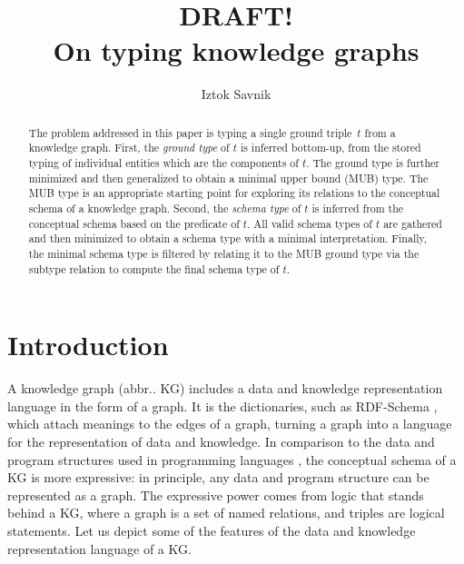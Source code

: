\documentclass[runningheads]{llncs}
\begin{document}
\title{DRAFT! \\ On typing knowledge graphs}

\author{Iztok Savnik} 



\maketitle

\begin{abstract}
  The problem addressed in this paper is typing a single ground
  triple~$t$ from a knowledge graph. First, the \emph{ground type} of
  $t$ is inferred bottom-up, from the stored typing of individual
  entities which are the components of $t$. The ground type is further
  minimized and then generalized to obtain a minimal upper bound (MUB)
  type. The MUB type is an appropriate starting point for exploring
  its relations to the conceptual schema of a knowledge graph. Second,
  the \emph{schema type} of $t$ is inferred from the conceptual schema
  based on the predicate of $t$. All valid schema types of $t$ are
  gathered and then minimized to obtain a schema type with a minimal
  interpretation. Finally, the minimal schema type is filtered by
  relating it to the MUB ground type via the subtype relation to
  compute the final schema type of $t$.

\end{abstract}


\thispagestyle{headings}




\section{Introduction}

A knowledge graph (abbr.. KG) includes a data and knowledge
representation language in the form of a graph. It is the
dictionaries, such as RDF-Schema \cite{rdfschema}, which attach
meanings to the edges of a graph, turning a graph into a language for
the representation of data and knowledge. In comparison to the data
and program structures used in programming languages
\cite{Pierce2002,Hindley1997}, the conceptual schema of a KG is more
expressive: in principle, any data and program structure can be
represented as a graph. The expressive power comes from logic that
stands behind a KG, where a graph is a set of named relations, and
triples are logical statements. Let us depict some of the features of
the data and knowledge representation language of a KG.
\end{document}
